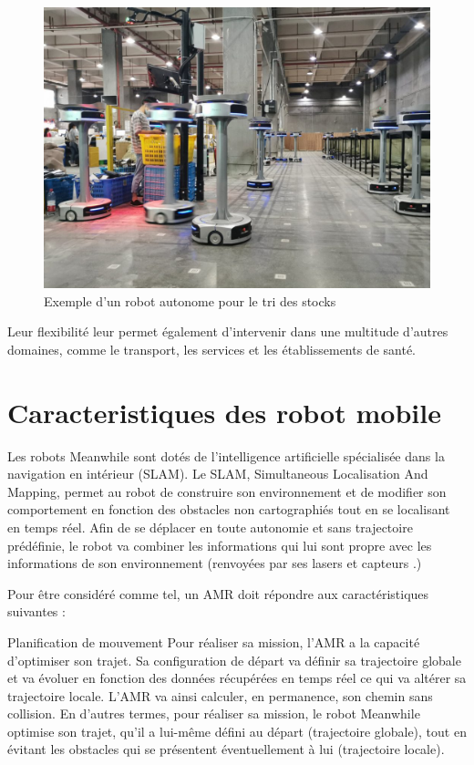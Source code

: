 \begin{figure}[h]
    \centering
    \includegraphics[width=14cm]{assets/amr_sort.jpg}
    \caption{Exemple d'un robot autonome pour le tri des stocks \cite{LargescaleAMRSorting2020}}
    \label{amr_sort}
    \end{figure}




Leur flexibilité leur permet également d’intervenir dans une multitude d’autres domaines, comme le transport, les services et les établissements de santé.


\section{Caracteristiques des robot mobile}
Les robots Meanwhile sont dotés de l’intelligence artificielle spécialisée dans la navigation en intérieur (SLAM). Le SLAM, Simultaneous Localisation And Mapping, permet au robot de construire son environnement et de modifier son comportement en fonction des obstacles non cartographiés tout en se localisant en temps réel. Afin de se déplacer en toute autonomie et sans trajectoire prédéfinie, le robot va combiner les informations qui lui sont propre avec les informations de son environnement (renvoyées par ses lasers et capteurs .)

 Pour être considéré comme tel, un AMR doit répondre aux caractéristiques suivantes :

Planification de mouvement
Pour réaliser sa mission, l’AMR a la capacité d’optimiser son trajet. Sa configuration de départ va définir sa trajectoire globale et va évoluer en fonction des données récupérées en temps réel ce qui va altérer sa trajectoire locale. L’AMR va ainsi calculer, en permanence, son chemin sans collision. En d’autres termes, pour réaliser sa mission, le robot Meanwhile optimise son trajet, qu’il a lui-même défini au départ (trajectoire globale), tout en évitant les obstacles qui se présentent éventuellement à lui (trajectoire locale).

